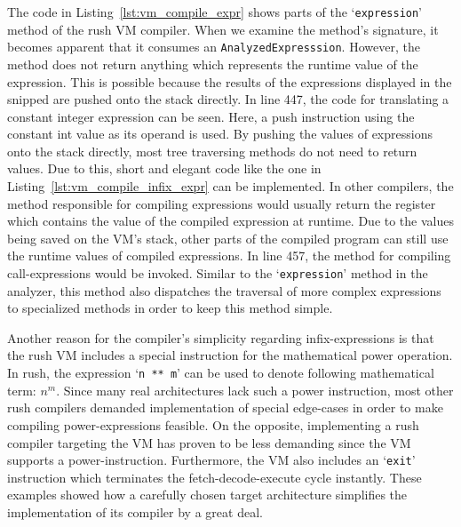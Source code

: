 The code in Listing~\ref{lst:vm_compile_expr} shows parts of the `\texttt{expression}' method of the rush VM compiler.
When we examine the method's signature, it becomes apparent that it consumes an \texttt{AnalyzedExpresssion}.
However, the method does not return anything which represents the runtime value of the expression.
This is possible because the results of the expressions displayed in the snipped are pushed onto the stack directly.
In line 447, the code for translating a constant integer expression can be seen.
Here, a push instruction using the constant int value as its operand is used.
By pushing the values of expressions onto the stack directly, most tree traversing methods do not need to return values.
Due to this, short and elegant code like the one in Listing~\ref{lst:vm_compile_infix_expr} can be implemented.
In other compilers, the method responsible for compiling expressions would usually return the register which contains the value of the compiled expression at runtime.
Due to the values being saved on the VM's stack, other parts of the compiled program can still use the runtime values of compiled expressions.
In line 457, the method for compiling call-expressions would be invoked.
Similar to the `\texttt{expression}' method in the analyzer, this method also dispatches the traversal of more complex expressions to specialized methods in order to keep this method simple.

Another reason for the compiler's simplicity regarding infix-expressions is that the rush VM includes a special instruction for the mathematical power operation.
In rush, the expression `\texttt{n ** m}' can be used to denote following mathematical term: $n^m$.
Since many real architectures lack such a power instruction, most other rush compilers demanded implementation of special edge-cases in order to make compiling power-expressions feasible.
On the opposite, implementing a rush compiler targeting the VM has proven to be less demanding since the VM supports a power-instruction.
Furthermore, the VM also includes an `\texttt{exit}' instruction which terminates the fetch-decode-execute cycle instantly.
These examples showed how a carefully chosen target architecture simplifies the implementation of its compiler by a great deal.

